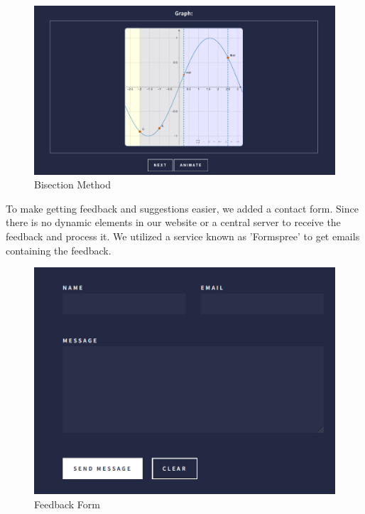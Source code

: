 \begin{figure}[h!]
\centering
\includegraphics[width=0.89\linewidth]{seemath7}
\caption{Bisection Method}
\end{figure}

\pagebreak
To make getting feedback and suggestions easier, we added a contact form. Since there is no dynamic elements in our website or a central server to receive the feedback and process it. We utilized a service known as 'Formspree'\cite{form} to get emails containing the feedback.

\begin{figure}[h!]
	\centering
	\includegraphics[width=0.5\linewidth]{seemath5}
	\caption{Feedback Form}
\end{figure}

